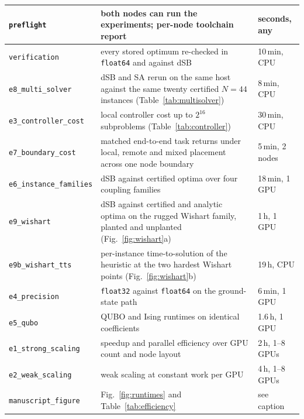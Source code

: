\documentclass[12pt,a4paper]{elsarticle}
\begin{document}
\begin{longtable}{|p{4.2cm}|p{5.3cm}|p{2.0cm}|}
\texttt{preflight} & both nodes can run the experiments; per-node toolchain
report & seconds, any \\
\hline
\texttt{verification} & every stored optimum re-checked in \texttt{float64} and
against dSB & 10\,min, CPU \\
\hline
\texttt{e8\_multi\_solver} & dSB and SA rerun on the same host against the same twenty certified
$N=44$ instances (Table~\ref{tab:multisolver}) & 8\,min, CPU \\
\hline
\texttt{e3\_controller\_cost} & local controller cost up to $2^{16}$ subproblems
(Table~\ref{tab:controller}) & 30\,min, CPU \\
\hline
\texttt{e7\_boundary\_cost} & matched end-to-end task returns under local, remote and mixed
placement across one node boundary & 5\,min, 2 nodes \\
\hline
\texttt{e6\_instance\_families} & dSB against certified optima over four
coupling families & 18\,min, 1 GPU \\
\hline
\texttt{e9\_wishart} & dSB against certified and analytic optima on the rugged
Wishart family, planted and unplanted (Fig.~\ref{fig:wishart}a) & 1\,h, 1 GPU \\
\hline
\texttt{e9b\_wishart\_tts} & per-instance time-to-solution of the heuristic at the
two hardest Wishart points (Fig.~\ref{fig:wishart}b) & 19\,h, CPU \\
\hline
\texttt{e4\_precision} & \texttt{float32} against \texttt{float64} on the
ground-state path & 6\,min, 1 GPU \\
\hline
\texttt{e5\_qubo} & QUBO and Ising runtimes on identical coefficients &
1.6\,h, 1 GPU \\
\hline
\texttt{e1\_strong\_scaling} & speedup and parallel efficiency over GPU count
and node layout & 2\,h, 1--8 GPUs \\
\hline
\texttt{e2\_weak\_scaling} & weak scaling at constant work per GPU &
4\,h, 1--8 GPUs \\
\hline
\texttt{manuscript\_figure} & Fig.~\ref{fig:runtimes} and
Table~\ref{tab:efficiency} & see caption \\

\end{longtable}
\end{document}
